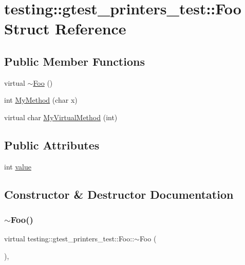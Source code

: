 \hypertarget{structtesting_1_1gtest__printers__test_1_1_foo}{}\section{testing\+:\+:gtest\+\_\+printers\+\_\+test\+:\+:Foo Struct Reference}
\label{structtesting_1_1gtest__printers__test_1_1_foo}
\subsection*{Public Member Functions}
\begin{DoxyCompactItemize}
\item 
virtual \hyperlink{structtesting_1_1gtest__printers__test_1_1_foo_a3797cc88591e06b40208ea7535cf33f6}{$\sim$\+Foo} ()
\item 
int \hyperlink{structtesting_1_1gtest__printers__test_1_1_foo_a703c1159114f3a640b16d470a9613672}{My\+Method} (char x)
\item 
virtual char \hyperlink{structtesting_1_1gtest__printers__test_1_1_foo_a368dc5150b27c2aaca6034830334e1cd}{My\+Virtual\+Method} (int)
\end{DoxyCompactItemize}
\subsection*{Public Attributes}
\begin{DoxyCompactItemize}
\item 
int \hyperlink{structtesting_1_1gtest__printers__test_1_1_foo_a8171a69191d34071ea4448d2dda501ec}{value}
\end{DoxyCompactItemize}


\subsection{Constructor \& Destructor Documentation}
\mbox{\label{structtesting_1_1gtest__printers__test_1_1_foo_a3797cc88591e06b40208ea7535cf33f6}} 
\subsubsection{\texorpdfstring{$\sim$\+Foo()}{~Foo()}}
{\footnotesize\ttfamily virtual testing\+::gtest\+\_\+printers\+\_\+test\+::\+Foo\+::$\sim$\+Foo (\begin{DoxyParamCaption}{ }\end{DoxyParamCaption})\hspace{0.3cm}{\ttfamily [inline]}, {\ttfamily [virtual]}}



